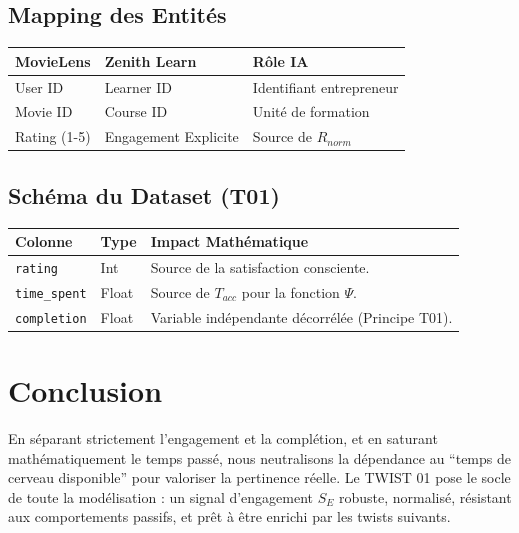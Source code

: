 \documentclass[11pt,a4paper]{article}
\begin{document}
\subsection{Mapping des Entités}
\begin{table}[h!]
\centering
\begin{tabular}{|l|l|l|}
\hline
\rowcolor{BrandDark} \color{white} MovieLens & \rowcolor{BrandDark} \color{white} Zenith Learn & \rowcolor{BrandDark} \color{white} Rôle IA \\ \hline
User ID & Learner ID & Identifiant entrepreneur \\ \hline
Movie ID & Course ID & Unité de formation \\ \hline
Rating (1-5) & Engagement Explicite & Source de $R_{norm}$ \\ \hline
\end{tabular}
\end{table}

\subsection{Schéma du Dataset (T01)}
\begin{table}[h!]
\centering
\begin{tabular}{|l|l|p{7cm}|}
\hline
\rowcolor{BrandDark} \color{white} Colonne & \rowcolor{BrandDark} \color{white} Type & \rowcolor{BrandDark} \color{white} Impact Mathématique \\ \hline
\texttt{rating} & Int & Source de la satisfaction consciente. \\ \hline
\texttt{time\_spent} & Float & Source de $T_{acc}$ pour la fonction $\Psi$. \\ \hline
\texttt{completion} & Float & Variable indépendante décorrélée (Principe T01). \\ \hline
\end{tabular}
\end{table}

\section{Conclusion}
En séparant strictement l'engagement et la complétion, et en saturant mathématiquement le temps passé, nous neutralisons la dépendance au ``temps de cerveau disponible'' pour valoriser la pertinence réelle. Le TWIST 01 pose le socle de toute la modélisation : un signal d'engagement $S_E$ robuste, normalisé, résistant aux comportements passifs, et prêt à être enrichi par les twists suivants.
\end{document}
